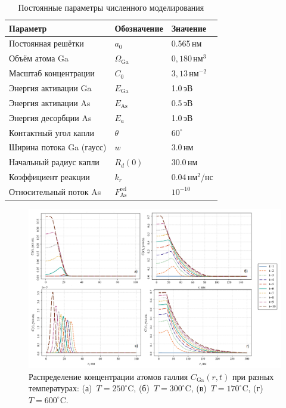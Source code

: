 \documentclass[14pt,oneside]{extarticle}
\begin{document}
\begin{table}
    \centering
    \caption{Постоянные параметры численного моделирования}
    \label{tab:params-fixed}
    \begin{tabular}{|l|l|l|}
    \hline
    \textbf{Параметр} & \textbf{Обозначение} & \textbf{Значение} \\ \hline
    Постоянная решётки & $a_0$ & 0.565\,нм \\ \hline
    Объём атома Ga & $\Omega_{\text{Ga}}$ &  $0{,}180\,\text{нм}^3$ \\ \hline
    Масштаб концентрации & $C_0$ & $ 3{,}13\,\text{нм}^{-2}$ \\ \hline
    Энергия активации Ga & $E_{\text{Ga}}$ & 1.0\,эВ \\ \hline
    Энергия активации As & $E_{\text{As}}$ & 0.5\,эВ \\ \hline
    Энергия десорбции As & $E_a$ & 1.0\,эВ \\ \hline
    Контактный угол капли & $\theta$ & $60^\circ$ \\ \hline
    Ширина потока Ga (гаусс) & $w$ & 3.0\,нм \\ \hline
    Начальный радиус капли & $R_d(0)$ & 30.0\,нм \\ \hline
    Коэффициент реакции & $k_r$ & 0.04\,нм$^2$/нс \\ \hline
    Относительный поток As & $F_{\text{As}}^{\text{rel}}$ & $10^{-10}$ \\ \hline
    \end{tabular}
\end{table}    

\begin{figure}
    \begin{center}
    \includegraphics[width=18cm]{images/C_Ga_t.png}
    \caption{\label{fig:c_ga_t} Распределение концентрации атомов галлия $C_{\text{Ga}}(r, t)$ при разных температурах: (а)~$T=250^\circ$C, (б)~$T=300^\circ$C, (в)~$T=170^\circ$C, (г)~$T=600^\circ$C.}
    \end{center}
\end{figure}
\end{document}

